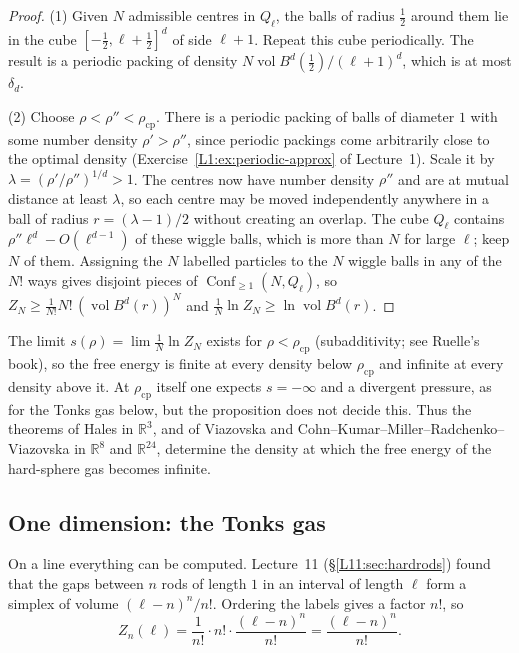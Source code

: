 \documentclass[11pt,openany]{book}
\theoremstyle{plain}
\theoremstyle{definition}
\theoremstyle{remark}
\newcommand{\R}{\mathbb{R}}
\newcommand{\vol}{\operatorname{vol}}
\newcommand{\Conf}{\operatorname{Conf}}
\newcommand{\dens}{\delta}             %
\newcommand{\Ball}{B}                  %
\begin{document}
\begin{proof}
(1) Given $N$ admissible centres in $Q_\ell$, the balls of radius $\frac12$ around them lie in the
cube $[-\frac12,\ell+\frac12]^d$ of side $\ell+1$. Repeat this cube periodically. The result is a
periodic packing of density $N\vol\Ball^d(\frac12)/(\ell+1)^d$, which is at most $\dens_d$.

(2) Choose $\rho<\rho''<\rho_{\mathrm{cp}}$. There is a periodic packing of balls of diameter $1$
with some number density $\rho'>\rho''$, since periodic packings come arbitrarily close to the optimal density
(Exercise~\ref{L1:ex:periodic-approx} of Lecture~1). Scale it by $\lambda=(\rho'/\rho'')^{1/d}>1$. The
centres now have number density $\rho''$ and are at mutual distance at least $\lambda$, so each centre may
be moved independently anywhere in a ball of radius $r=(\lambda-1)/2$ without creating an overlap.
The cube $Q_\ell$ contains $\rho''\ell^d-O(\ell^{d-1})$ of these wiggle balls, which is more than $N$ for
large $\ell$; keep $N$ of them. Assigning the $N$ labelled particles to the $N$ wiggle balls in any of
the $N!$ ways gives disjoint pieces of $\Conf_{\ge1}(N,Q_\ell)$, so
$Z_N\ge\frac1{N!}N!\,(\vol\Ball^d(r))^N$ and $\frac1N\ln Z_N\ge\ln\vol\Ball^d(r)$.
\end{proof}

The limit $s(\rho)=\lim\frac1N\ln Z_N$ exists for $\rho<\rho_{\mathrm{cp}}$ (subadditivity; see Ruelle's
book), so the free energy is finite at every density below $\rho_{\mathrm{cp}}$ and infinite at every
density above it. At $\rho_{\mathrm{cp}}$ itself one expects $s=-\infty$ and a divergent pressure, as for the
Tonks gas below, but the proposition does not decide this. Thus the theorems of Hales in $\R^3$, and of Viazovska and
Cohn--Kumar--Miller--Radchenko--Viazovska in $\R^8$ and $\R^{24}$, determine the density at which the
free energy of the hard-sphere gas becomes infinite.

\subsection*{One dimension: the Tonks gas}

On a line everything can be computed. Lecture~11 (\S\ref{L11:sec:hardrods}) found that the gaps
between $n$ rods of length $1$ in an interval of length $\ell$ form a simplex of volume
$(\ell-n)^n/n!$. Ordering the labels gives a factor $n!$, so
\[
  Z_n(\ell)=\frac{1}{n!}\cdot n!\cdot\frac{(\ell-n)^n}{n!}=\frac{(\ell-n)^n}{n!}.
\]
\end{document}
